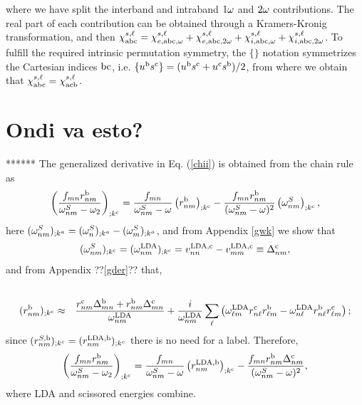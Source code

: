\documentclass[floatfix,prb,aps,superscriptaddress,11pt,preprint]{revtex4}
\begin{document}
where we have split the interband and intraband $1\omega$ and $2\omega$
contributions. The real part of each contribution can be obtained through
a Kramers-Kronig transformation,\cite{nicolas} and then
$\chi^{s,\ell}_{\mathrm{a}\mathrm{b}\mathrm{c}}=\chi^{s,\ell}_{e,\mathrm{a}\mathrm{b}\mathrm{c},\omega}+\chi^{s,\ell}_{e,\mathrm{a}\mathrm{b}\mathrm{c},2\omega}+\chi^{s,\ell}_{i,\mathrm{a}\mathrm{b}\mathrm{c},\omega}+\chi^{s,\ell}_{i,\mathrm{a}\mathrm{b}\mathrm{c},2\omega}
$.
To 
fulfill the required intrinsic
permutation symmetry,\cite{rashkeev_efficient_1998} 
the
$\{\}$ notation symmetrizes the Cartesian indices $\mathrm{b}\mathrm{c}$, i.e. 
$\{u^{\mathrm{b}}s^{\mathrm{c}}\}=(u^{\mathrm{b}}s^{\mathrm{c}}+u^{\mathrm{c}}s^{\mathrm{b}})/2$,
from where we obtain that
$\chi_{\mathrm{a}\mathrm{b}\mathrm{c}}^{s,\ell}=\chi_{\mathrm{a}\mathrm{c}\mathrm{b}}^{s,\ell}$.




\section{Ondi va esto?}
******
The generalized derivative
in Eq. (\ref{chii}) is obtained from the chain rule as
\begin{equation}\label{gene}
\left(\frac{f_{mn}r_{nm}^{\mathrm{b}}}{\omega^S_{nm}-\omega_2}\right)_{;k^{\mathrm{c}}}=
\frac{f_{mn}}{\omega^S_{nm}-\omega}\left(r_{nm}^{\mathrm{b}}\right)_{;k^{\mathrm{c}}}
-\frac{f_{mn}r_{nm}^{\mathrm{b}}}{(\omega^S_{nm}-\omega)^2}\left(\omega^S_{nm}\right)_{;k^{\mathrm{c}}},
\end{equation} 
here $(\omega^S_{nm})_{;k^a}=(\omega^S_{n})_{;k^a}-(\omega^S_{m})_{;k^a}$, and 
from Appendix \ref{gwk} we show that 
\begin{equation}\label{wk}
(\omega^S_{nm})_{;k^{\mathrm{c}}}=(\omega^{\mathrm{LDA}}_{nm})_{;k^{\mathrm{c}}}=
v_{nn}^{\mathrm{LDA},\mathrm{c}}-v_{mm}^{\mathrm{LDA},\mathrm{c}}\equiv\Delta_{nm}^{\mathrm{c}}
,
\end{equation}
and from Appendix ??\ref{gder}?? that,\cite{nastos_scissors_2005}
\begin{eqnarray}\label{rgk}
\nonumber\\
(r^{\mathrm{b}}_{nm})_{;k^{\mathrm{c}}}
&\approx&
\frac{r_{nm}^{\mathrm{c}}\Delta_{mn}^{\mathrm{b}}+r_{nm}^{\mathrm{b}}\Delta_{mn}^{\mathrm{c}}}{\omega^{\mathrm{LDA}}_{nm}}
+\frac{i}{\omega^{\mathrm{LDA}}_{nm}}\sum_\ell\left(\omega^{\mathrm{LDA}}_{\ell m}r_{n\ell}^{\mathrm{c}}r_{\ell m}^{\mathrm{b}}
-\omega^{\mathrm{LDA}}_{n \ell}r_{n\ell}^{\mathrm{b}}r_{\ell m}^{\mathrm{c}}\right);
\end{eqnarray} 
since
$(r^{S,\mathrm{b}}_{nm})_{;k^{\mathrm{c}}}
=
(r^{\mathrm{LDA},\mathrm{b}}_{nm})_{;k^{\mathrm{c}}}
$ there is no need for a label.
Therefore,
\begin{equation}\label{gene2}
\left(\frac{f_{mn}r_{nm}^{\mathrm{b}}}{\omega^S_{nm}-\omega_2}\right)_{;k^{\mathrm{c}}}=
\frac{f_{mn}}{\omega^S_{nm}-\omega}\left(r_{nm}^{\mathrm{LDA},\mathrm{b}}\right)_{;k^{\mathrm{c}}}
-\frac{f_{mn}r_{nm}^{\mathrm{b}}\Delta_{nm}^{\mathrm{c}}}{(\omega^S_{nm}-\omega)^2}
,
\end{equation}
where LDA and scissored energies combine.
\end{document}
